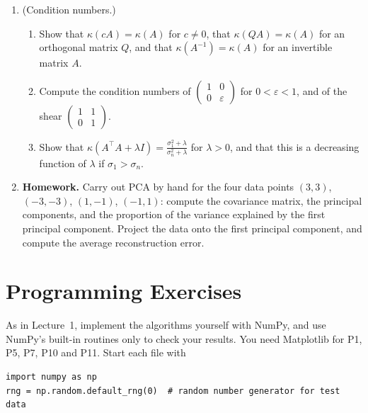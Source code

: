 \documentclass[11pt]{article}
\newcommand{\homework}{\textcolor{red!70!black}{\textbf{Homework.}}}
\newcommand{\norm}[1]{\lVert #1 \rVert}
\theoremstyle{definition}
\theoremstyle{plain}
\theoremstyle{remark}
\begin{document}
\begin{enumerate}[leftmargin=*]
\begin{enumerate}[label=(\alph*)]
        \item the singular values of a symmetric matrix are the absolute values of its nonzero eigenvalues;
        \item $A^\top A$ and $AA^\top$ have the same nonzero eigenvalues;
        \item $\norm{A}_2 = \norm{A^\top}_2$.
    \end{enumerate}
    \item (Condition numbers.)
    \begin{enumerate}
        \item Show that $\kappa(cA) = \kappa(A)$ for $c \neq 0$, that $\kappa(QA) = \kappa(A)$ for an orthogonal matrix $Q$, and that $\kappa(A^{-1}) = \kappa(A)$ for an invertible matrix $A$.
        \item Compute the condition numbers of $\begin{pmatrix} 1 & 0 \\ 0 & \varepsilon \end{pmatrix}$ for $0 < \varepsilon < 1$, and of the shear $\begin{pmatrix} 1 & 1 \\ 0 & 1 \end{pmatrix}$.
        \item Show that $\kappa(A^\top A + \lambda I) = \frac{\sigma_1^2 + \lambda}{\sigma_n^2 + \lambda}$ for $\lambda > 0$, and that this is a decreasing function of $\lambda$ if $\sigma_1 > \sigma_n$.
    \end{enumerate}
    \item \homework{} Carry out PCA by hand for the four data points $(3, 3)$, $(-3, -3)$, $(1, -1)$, $(-1, 1)$: compute the covariance matrix, the principal components, and the proportion of the variance explained by the first principal component. Project the data onto the first principal component, and compute the average reconstruction error.
\end{enumerate}

\section{Programming Exercises}\label{sec:programming}

\setlength{\emergencystretch}{3em}

As in Lecture~1, implement the algorithms yourself with NumPy, and use NumPy's built-in routines only to check your results. You need Matplotlib for P1, P5, P7, P10 and P11. Start each file with
\begin{lstlisting}
import numpy as np
rng = np.random.default_rng(0)  # random number generator for test data
\end{lstlisting}
\end{document}
